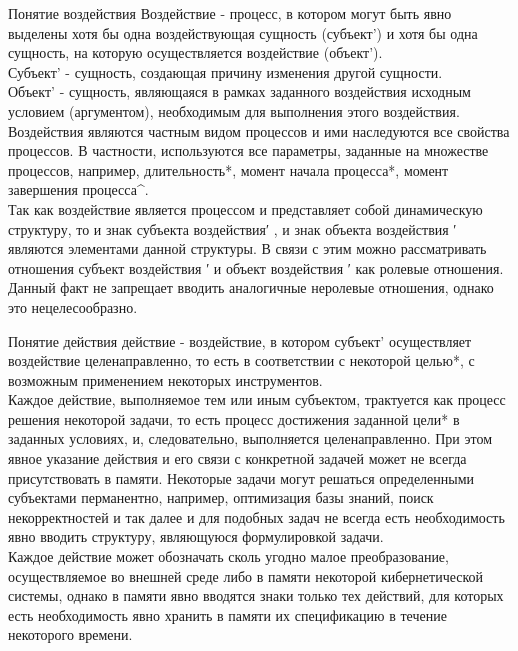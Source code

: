 \begin{frame}{\large Понятие воздействия}
\vspace{23}
    Воздействие - процесс, в котором могут быть явно выделены хотя бы одна воздействующая сущность (субъект') и хотя бы одна сущность, на которую осуществляется воздействие (объект').\\
    Субъект' - сущность, создающая причину изменения другой сущности.\\
    Объект' - сущность, являющаяся в рамках заданного воздействия исходным условием (аргументом), необходимым для выполнения этого воздействия.\\
    Воздействия являются частным видом процессов и ими наследуются все свойства процессов. В частности, используются все параметры, заданные на множестве процессов, например, длительность*, момент начала процесса*, момент завершения процесса^.\\
    Так как воздействие является процессом и представляет собой динамическую структуру, то и знак субъекта воздействия′ , и знак объекта воздействия ′ являются элементами данной структуры. В связи с этим можно рассматривать отношения субъект воздействия ′ и объект воздействия ′ как ролевые отношения. Данный факт не запрещает вводить аналогичные неролевые отношения, однако это нецелесообразно.
\end{frame}

\begin{frame}{\large Понятие действия}
\vspace{23}
    действие - воздействие, в котором субъект' осуществляет воздействие целенаправленно, то есть в соответствии с некоторой целью*, с возможным применением некоторых инструментов.\\
    Каждое действие, выполняемое тем или иным субъектом, трактуется как процесс решения некоторой задачи, то есть процесс достижения заданной цели* в заданных условиях, и, следовательно, выполняется целенаправленно. При этом явное указание действия и его связи с конкретной задачей может не всегда присутствовать в памяти. Некоторые задачи могут решаться определенными субъектами перманентно, например, оптимизация базы знаний, поиск некорректностей и так далее и для подобных задач не всегда есть необходимость явно вводить структуру, являющуюся формулировкой задачи.\\ 
    Каждое действие может обозначать сколь угодно малое преобразование, осуществляемое во внешней среде либо в памяти некоторой кибернетической системы, однако в памяти явно вводятся знаки только тех действий, для которых есть необходимость явно хранить в памяти их спецификацию в течение некоторого времени.
\end{frame}

